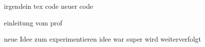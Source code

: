 irgendein tex code
neuer code

einleitung vom prof

neue Idee zum experimentieren
idee war super wird weiterverfolgt
